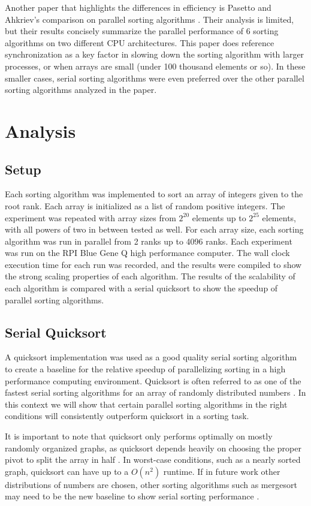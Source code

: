 \documentclass[10pt,letterpaper]{article}
\begin{document}
\begin{multicols}{2}
Another paper that highlights the differences in efficiency is Pasetto and Ahkriev's comparison on parallel sorting algorithms \cite{Pasetto:2011:CSP:2048147.2048207}. Their analysis is limited, but their results concisely summarize the parallel performance of 6 sorting algorithms on two different CPU architectures. This paper does reference synchronization as a key factor in slowing down the sorting algorithm with larger processes, or when arrays are small (under 100 thousand elements or so). In these smaller cases, serial sorting algorithms were even preferred over the other parallel sorting algorithms analyzed in the paper.

\section{Analysis}
\subsection{Setup}
Each sorting algorithm was implemented to sort an array of integers given to the root rank. Each array is initialized as a list of random positive integers. The experiment was repeated with array sizes from $2^{20}$ elements up to $2^{25}$ elements, with all powers of two in between tested as well. For each array size, each sorting algorithm was run in parallel from 2 ranks up to 4096 ranks. Each experiment was run on the RPI Blue Gene Q high performance computer. The wall clock execution time for each run was recorded, and the results were compiled to show the strong scaling properties of each algorithm. The results of the scalability of each algorithm is compared with a serial quicksort to show the speedup of parallel sorting algorithms.
\subsection{Serial Quicksort}
A quicksort implementation was used as a good quality serial sorting algorithm to create a baseline for the relative speedup of parallelizing sorting in a high performance computing environment. Quicksort is often referred to as one of the fastest serial sorting algorithms for an array of randomly distributed numbers \cite{10.1093/comjnl/5.1.10}. In this context we will show that certain parallel sorting algorithms in the right conditions will consistently outperform quicksort in a sorting task.

It is important to note that quicksort only performs optimally on mostly randomly organized graphs, as quicksort depends heavily on choosing the proper pivot to split the array in half \cite{10.1093/comjnl/5.1.10}. In worst-case conditions, such as a nearly sorted graph, quicksort can have up to a $O(n^2)$ runtime. If in future work other distributions of numbers are chosen, other sorting algorithms such as mergesort may need to be the new baseline to show serial sorting performance \cite{Knuth:1998:ACP:280635}.


\end{multicols}
\end{document}
